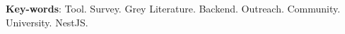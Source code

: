\begin{resumo}[Abstract]

 \vspace{\onelineskip}
 
 \noindent 
 \textbf{Key-words}: Tool. Survey. Grey Literature. Backend. Outreach. Community. University. NestJS.
\end{resumo}
